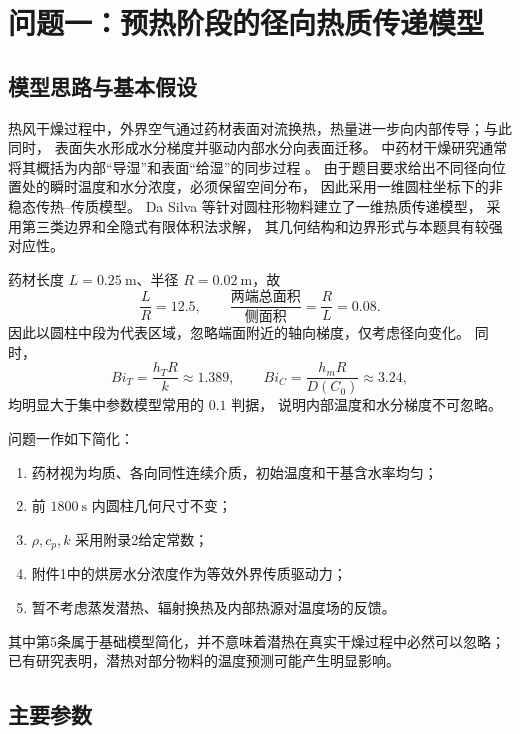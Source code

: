 \documentclass[UTF8,a4paper,12pt]{ctexart}
\begin{document}
\section{问题一：预热阶段的径向热质传递模型}

\subsection{模型思路与基本假设}

热风干燥过程中，外界空气通过药材表面对流换热，热量进一步向内部传导；与此同时，
表面失水形成水分梯度并驱动内部水分向表面迁移。
中药材干燥研究通常将其概括为内部“导湿”和表面“给湿”的同步过程
\cite{wang2024}。
由于题目要求给出不同径向位置处的瞬时温度和水分浓度，必须保留空间分布，
因此采用一维圆柱坐标下的非稳态传热--传质模型。
Da Silva 等针对圆柱形物料建立了一维热质传递模型，
采用第三类边界和全隐式有限体积法求解\cite{dasilva2014}，
其几何结构和边界形式与本题具有较强对应性。

药材长度 $L=0.25~\mathrm m$、半径 $R=0.02~\mathrm m$，故
\[
\frac{L}{R}=12.5,\qquad
\frac{\text{两端总面积}}{\text{侧面积}}=\frac{R}{L}=0.08.
\]
因此以圆柱中段为代表区域，忽略端面附近的轴向梯度，仅考虑径向变化。
同时，
\[
Bi_T=\frac{h_TR}{k}\approx1.389,
\qquad
Bi_C=\frac{h_mR}{D(C_0)}\approx3.24,
\]
均明显大于集中参数模型常用的 $0.1$ 判据，
说明内部温度和水分梯度不可忽略。

问题一作如下简化：
\begin{enumerate}
    \item 药材视为均质、各向同性连续介质，初始温度和干基含水率均匀；
    \item 前 $1800~\mathrm s$ 内圆柱几何尺寸不变；
    \item $\rho,c_p,k$ 采用附录2给定常数；
    \item 附件1中的烘房水分浓度作为等效外界传质驱动力；
    \item 暂不考虑蒸发潜热、辐射换热及内部热源对温度场的反馈。
\end{enumerate}

其中第5条属于基础模型简化，并不意味着潜热在真实干燥过程中必然可以忽略；
已有研究表明，潜热对部分物料的温度预测可能产生明显影响\cite{dasilva2014}。

\subsection{主要参数}
\end{document}
